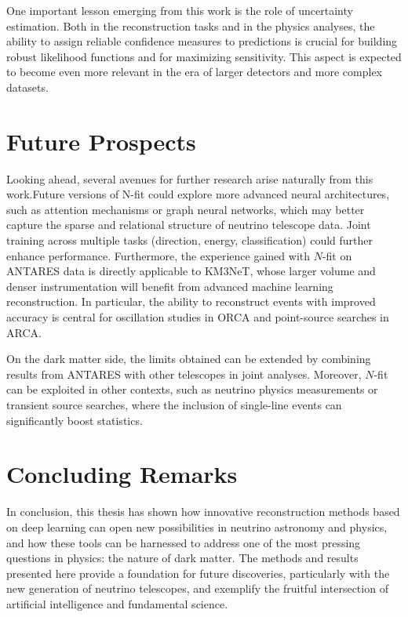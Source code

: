 One important lesson emerging from this work is the role of uncertainty estimation. Both in the reconstruction tasks and in the physics analyses, the ability to assign reliable confidence measures to predictions is crucial for building robust likelihood functions and for maximizing sensitivity. This aspect is expected to become even more relevant in the era of larger detectors and more complex datasets.

\section*{Future Prospects}

Looking ahead, several avenues for further research arise naturally from this work.Future versions of N-fit could explore more advanced neural architectures, such as attention mechanisms or graph neural networks, which may better capture the sparse and relational structure of neutrino telescope data. Joint training across multiple tasks (direction, energy, classification) could further enhance performance. Furthermore, the experience gained with $N$-fit on ANTARES data is directly applicable to KM3NeT, whose larger volume and denser instrumentation will benefit from advanced machine learning reconstruction. In particular, the ability to reconstruct events with improved accuracy is central for oscillation studies in ORCA and point-source searches in ARCA.

On the dark matter side, the limits obtained can be extended by combining results from ANTARES with other telescopes in joint analyses. Moreover, $N$-fit can be exploited in other contexts, such as neutrino physics measurements or transient source searches, where the inclusion of single-line events can significantly boost statistics.

\section*{Concluding Remarks}

In conclusion, this thesis has shown how innovative reconstruction methods based on deep learning can open new possibilities in neutrino astronomy and physics, and how these tools can be harnessed to address one of the most pressing questions in physics: the nature of dark matter. The methods and results presented here provide a foundation for future discoveries, particularly with the new generation of neutrino telescopes, and exemplify the fruitful intersection of artificial intelligence and fundamental science.
